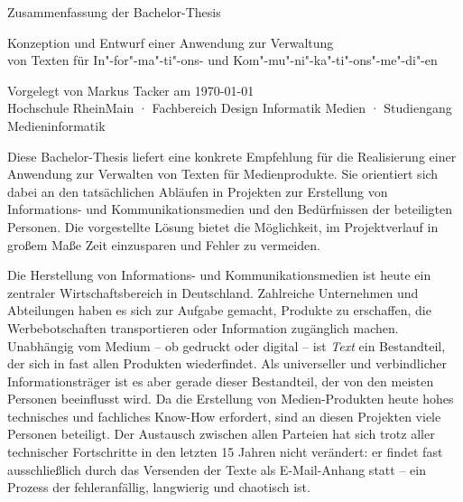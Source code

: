\documentclass[11pt,a4paper]{article}
\begin{document}
\setmainfont[Mapping=tex-text]{Museo Sans}

\begin{center}
Zusammenfassung der Bachelor-Thesis\\
\begin{large}
Konzeption und Entwurf einer Anwendung zur Verwaltung\\von Texten für In"-for"-ma"-ti"-ons- und Kom"-mu"-ni"-ka"-ti"-ons"-me"-di"-en\\
\end{large}
\bigskip
\begin{tiny}
Vorgelegt von Markus Tacker am \today\\
Hochschule RheinMain · Fachbereich Design Informatik Medien · Studiengang Medieninformatik\\
\end{tiny}
\end{center}

\setmainfont[Mapping=tex-text,BoldFont={Vollkorn-Bold},ItalicFont={Vollkorn-Italic},BoldItalicFont={Vollkorn-Bold Italic}]{Vollkorn}
\setsansfont[Mapping=tex-text]{Museo Sans}

Diese Bachelor-Thesis liefert eine konkrete Empfehlung für die Realisierung einer Anwendung zur Verwalten von Texten für Medienprodukte. Sie orientiert sich dabei an den tatsächlichen Abläufen in Projekten zur Erstellung von Informations- und Kommunikationsmedien und den Bedürfnissen der beteiligten Personen. Die vorgestellte Lösung bietet die Möglichkeit, im Projektverlauf in großem Maße Zeit einzusparen und Fehler zu vermeiden.

\secbar

Die Herstellung von Informations- und Kommunikationsmedien ist heute ein zentraler Wirtschaftsbereich in Deutschland. Zahlreiche Unternehmen und Abteilungen haben es sich zur Aufgabe gemacht, Produkte zu erschaffen, die Werbebotschaften transportieren oder Information zugänglich machen. Unabhängig vom Medium -- ob gedruckt oder digital -- ist \emph{Text} ein Bestandteil, der sich in fast allen Produkten wiederfindet. Als universeller und verbindlicher Informationsträger ist es aber gerade dieser Bestandteil, der von den meisten Personen beeinflusst wird. Da die Erstellung von Medien-Produkten heute hohes technisches und fachliches Know-How erfordert, sind an diesen Projekten viele Personen beteiligt. Der Austausch zwischen allen Parteien hat sich trotz aller technischer Fortschritte in den letzten 15 Jahren nicht verändert: er findet fast ausschließlich durch das Versenden der Texte als E-Mail-Anhang statt -- ein Prozess der fehleranfällig, langwierig und chaotisch ist. 
\end{document}
